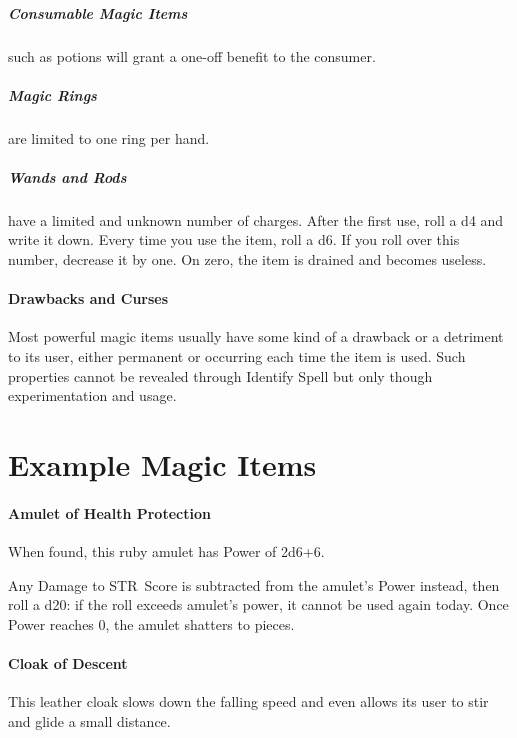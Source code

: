 \documentclass[itdr]{subfiles}
\begin{document}
\vfill

\subparagraph{Consumable Magic Items} such as potions will grant a one-off benefit to the consumer.

\vfill

\subparagraph{Magic Rings} are limited to one ring per hand.

\vfill

\subparagraph{Wands and Rods} have a limited and unknown number of charges. After the first use, roll a d4 and write it down. Every time you use the item, roll a d6. If you roll over this number, decrease it by one. On zero, the item is drained and becomes useless.

\vfill

\paragraph{Drawbacks and Curses}
Most powerful magic items usually have some kind of a drawback or a detriment to its user, either \mbox{permanent} or occurring each time the item is used. Such properties cannot be revealed through Identify Spell but only though experimentation and usage.

\vfill
{}
\vfill
\break


\section{Example Magic Items}

\paragraph{Amulet of Health Protection}
When found, this ruby amulet has Power of 2d6+6.

Any Damage to STR~Score is subtracted from the amulet's Power instead, then roll a d20: if the roll exceeds amulet's power, it cannot be used again today. Once Power reaches 0, the amulet shatters to pieces.

\vfill
\paragraph{Cloak of Descent}
This leather cloak slows down the falling speed and even allows its user to stir and glide a small distance.
\end{document}
